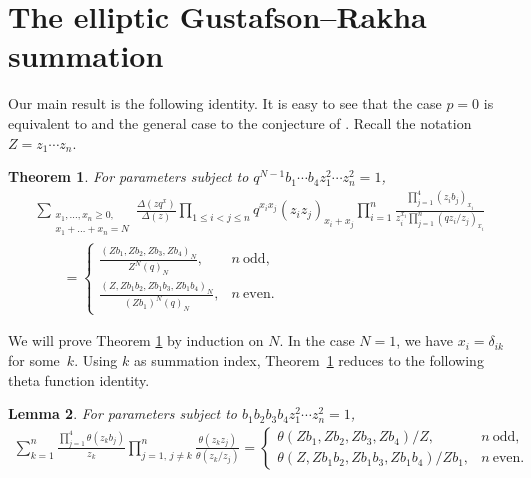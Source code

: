 \documentclass[11pt]{article}
\numberwithin{equation}{section}
\newtheorem{Theorem}{Theorem}[section]
\newtheorem{Lemma}[Theorem]{Lemma}
\begin{document}
\setcounter{section}{2}
\setcounter{subsection}{0}
\setcounter{subsubsection}{0}
\setcounter{Theorem}{0}
\setcounter{equation}{5}
\section{The elliptic Gustafson--Rakha summation}\label{ms}

Our main result is the following identity. It is easy to see that the case $p=0$ is equivalent to \cite[Theorem~1.2]{gr} and the general case to the conjecture of \cite[p.~953]{sp}. Recall the notation $Z=z_1\dotsm z_n$.

\begin{Theorem}\label{grt}
For parameters subject to $q^{N-1}b_1\dotsm b_4z_1^2\dotsm z_n^2=1$,
\begin{gather}\sum_{\substack{x_1,\dots,x_n\geq 0,\\x_1+\dots+x_n=N}}
\frac{\Delta(zq^x)}{\Delta(z)}\prod\limits_{1\leq i<j\leq n}q^{x_ix_j}(z_iz_j)_{x_i+x_j}\prod\limits_{i=1}^n
\frac{\prod\limits_{j=1}^4(z_ib_j)_{x_i}}{z_i^{x_i}\prod\limits_{j=1}^n(qz_i/z_j)_{x_i}}\nonumber\\
\qquad{} =\begin{cases}
\displaystyle\frac{(Zb_1,Zb_2,Zb_3,Zb_4)_N}{Z^N(q)_N}, & n~\text{odd},\\[4mm]
\displaystyle\frac{(Z,Zb_1b_2,Zb_1b_3,Zb_1b_4)_N}{(Zb_1)^N(q)_N}, & n~\text{even}.
\end{cases}\label{gri}
\end{gather}
\end{Theorem}

We will prove Theorem \ref{grt} by induction on $N$. In the case $N=1$, we have $x_i=\delta_{ik}$ for some~$k$. Using $k$ as summation index,
Theorem~\ref{grt} reduces to the following theta function identity.

\begin{Lemma}
For parameters subject to $b_1b_2b_3b_4z_1^2\dotsm z_n^2=1$,
\begin{gather}\label{ib}\sum_{k=1}^n\frac{\prod\limits_{j=1}^4\theta(z_kb_j)}{z_k}\prod\limits_{j=1,\,j\neq k}^n\frac{\theta(z_kz_j)}{\theta(z_k/z_j)}
=\begin{cases}
\theta(Zb_1,Zb_2,Zb_3,Zb_4)/Z, & n~\text{odd},\\
\theta(Z,Zb_1b_2,Zb_1b_3,Zb_1b_4)/Zb_1, & n~\text{even}.
 \end{cases} \end{gather}
\end{Lemma}
\end{document}
